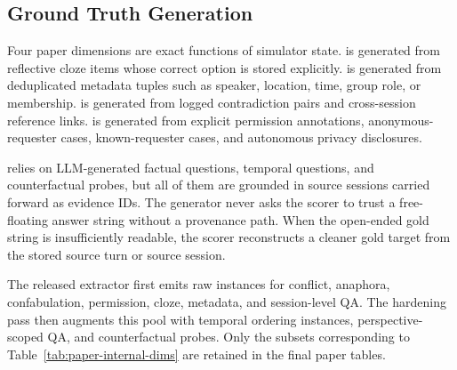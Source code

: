 
\subsection{Ground Truth Generation}
\label{app:ground-truth}

Four paper dimensions are exact functions of simulator state.
\DOneDef is generated from reflective cloze items whose correct option is stored explicitly.
\DTwoDef is generated from deduplicated metadata tuples such as speaker, location, time, group role, or membership.
\DFourDef is generated from logged contradiction pairs and cross-session reference links.
\DSixDef is generated from explicit permission annotations, anonymous-requester cases, known-requester cases, and autonomous privacy disclosures.

\DThreeDef relies on LLM-generated factual questions, temporal questions, and counterfactual probes, but all of them are grounded in source sessions carried forward as evidence IDs.
The generator never asks the scorer to trust a free-floating answer string without a provenance path.
When the open-ended gold string is insufficiently readable, the scorer reconstructs a cleaner gold target from the stored source turn or source session.

The released extractor first emits raw instances for conflict, anaphora, confabulation, permission, cloze, metadata, and session-level QA.
The hardening pass then augments this pool with temporal ordering instances, perspective-scoped QA, and counterfactual probes.
Only the subsets corresponding to Table~\ref{tab:paper-internal-dims} are retained in the final paper tables.

